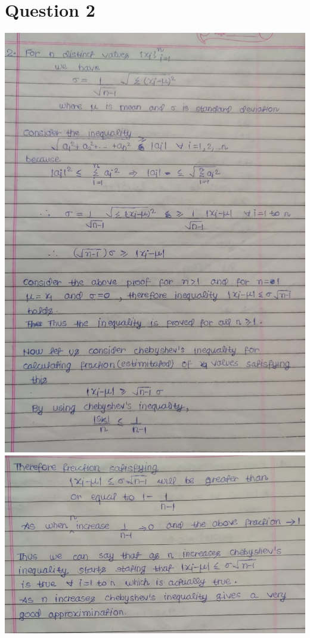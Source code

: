 \documentclass{article}
\theoremstyle{remark}
\begin{document}
\section{Question 2}
\begin{center}
    \includegraphics[width=\textwidth,height=\textheight,keepaspectratio]{q2_1.jpeg}
    \newpage
    \includegraphics[width=\textwidth,height=\textheight,keepaspectratio]{q2_2.jpeg}
\end{center}
\end{document}
